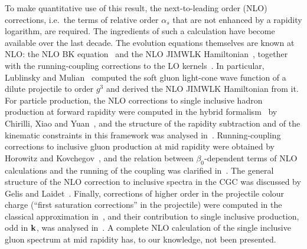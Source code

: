 To make quantitative use of this result, the next-to-leading order (NLO) corrections, i.e.\ the terms of relative order $\alpha_s$ that are not enhanced by a rapidity logarithm, are required. The ingredients of such a calculation have become available over the last decade. The evolution equations themselves are known at NLO: the NLO BK equation~\cite{Balitsky:2007feb} and the NLO JIMWLK Hamiltonian~\cite{Balitsky:2013fea,Kovner:2013ona,Kovner:2014lca,Grabovsky:2013mba}, together with the running-coupling corrections to the LO kernels~\cite{Balitsky:2006wa,Kovchegov:2006vj,Kovchegov:2006wf}. In particular, Lublinsky and Mulian~\cite{Lublinsky:2016meo} computed the soft gluon light-cone wave function of a dilute projectile to order $g^3$ and derived the NLO JIMWLK Hamiltonian from it. For particle production, the NLO corrections to single inclusive hadron production at forward rapidity were computed in the hybrid formalism~\cite{Dumitru:2005gt,Altinoluk:2011qy} by Chirilli, Xiao and Yuan~\cite{Chirilli:2011km,Chirilli:2012jd}, and the structure of the rapidity subtraction and of the kinematic constraints in this framework was analysed in~\cite{Stasto:2013cha,Altinoluk:2014eka,Ducloue:2016shw}. Running-coupling corrections to inclusive gluon production at mid rapidity were obtained by Horowitz and Kovchegov~\cite{Horowitz:2010yg}, and the relation between $\beta_0$-dependent terms of NLO calculations and the running of the coupling was clarified in~\cite{Kovner:2023vsy}. The general structure of the NLO correction to inclusive spectra in the CGC was discussed by Gelis and Laidet~\cite{Gelis:2012ri}. Finally, corrections of higher order in the projectile colour charge (``first saturation corrections'' in the projectile) were computed in the classical approximation in~\cite{Chirilli:2015tea,Li:2021zmf,Li:2021ntm}, and their contribution to single inclusive production, odd in $\mathbf{k}$, was analysed in~\cite{McLerran:2016snu,Kovchegov:2018jun}. A complete NLO calculation of the single inclusive gluon spectrum at mid rapidity has, to our knowledge, not been presented.

